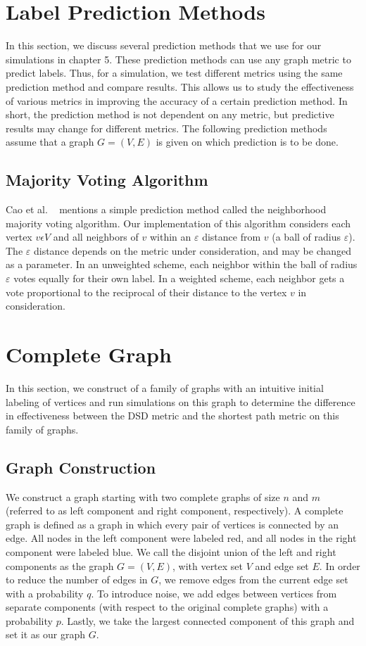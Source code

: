\section{Label Prediction Methods}
In this section, we discuss several prediction methods that we use for our simulations in chapter 5. These prediction methods can use any graph metric to predict labels. Thus, for a simulation, we test different metrics using the same prediction method and compare results. This allows us to study the effectiveness of various metrics in improving the accuracy of a certain prediction method. In short, the prediction method is not dependent on any metric, but predictive results may change for different metrics. The following prediction methods assume that a graph $G=(V,E)$ is given on which prediction is to be done.

\subsection{Majority Voting Algorithm}
Cao et al. ~\cite{10.1371/journal.pone.0076339} mentions a simple prediction method called the neighborhood majority voting algorithm. Our implementation of this algorithm considers each vertex $v \epsilon V$ and all neighbors of $v$ within an $\varepsilon$ distance from $v$ (a ball of radius $\varepsilon$). The $\varepsilon$ distance depends on the metric under consideration, and may be changed as a parameter. In an unweighted scheme, each neighbor within the ball of radius $\varepsilon$ votes equally for their own label. In a weighted scheme, each neighbor gets a vote proportional to the reciprocal of their distance to the vertex $v$ in consideration.


\section{Complete Graph}
In this section, we construct of a family of graphs with an intuitive initial labeling of vertices and run simulations on this graph to determine the difference in effectiveness between the DSD metric and the shortest path metric on this family of graphs.

\subsection{Graph Construction}
We construct a graph starting with two complete graphs of size $n$ and $m$ (referred to as left component and right component, respectively). A complete graph is defined as a graph in which every pair of vertices is connected by an edge. All nodes in the left component were labeled red, and all nodes in the right component were labeled blue. We call the disjoint union of the left and right components as the graph $G = (V,E)$, with vertex set $V$ and edge set $E$. In order to reduce the number of edges in $G$, we remove edges from the current edge set with a probability $q$. To introduce noise, we add edges between vertices from separate components (with respect to the original complete graphs) with a probability $p$. Lastly, we take the largest connected component of this graph and set it as our graph $G$.

